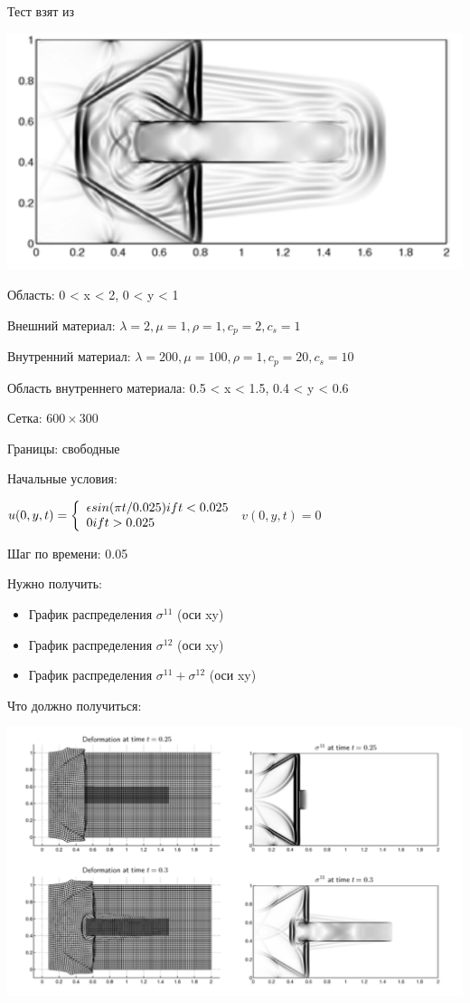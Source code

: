 \documentclass{article}
\newenvironment{system}{\left\{
\begin{array}{l}}
{\end{array}\right.}
\begin{document}
Тест взят из \cite{finite}

\includegraphics[scale=0.5]{2D_seismic_tests/3.png}

Область: 0 < x < 2, 0 < y < 1

Внешний материал: $ \lambda = 2, \mu = 1, \rho = 1, c_p = 2, c_s = 1$

Внутренний материал: $ \lambda = 200, \mu = 100, \rho = 1, c_p = 20, c_s = 10$

Область внутреннего материала: 0.5 < x < 1.5,  0.4 < y < 0.6

Сетка: $600\times300$

Границы: свободные

Начальные условия:

$u(0,y,t)= 
 \begin{system}
\epsilon sin(\pi t/ 0.025)  if t<0.025 
\\
0 if t > 0.025 
\end{system}$
$v(0,y,t)=0$

Шаг по времени: 0.05

Нужно получить: 

\begin{itemize}
\item График распределения $\sigma^{11}$ (оси xy)

\item График распределения $\sigma^{12}$ (оси xy)

\item График распределения $\sigma^{11} + \sigma^{12}$ (оси xy)

\end{itemize}

Что должно получиться:

\includegraphics[scale=0.35]{2D_seismic_tests/inclusion1.png}
\end{document}
